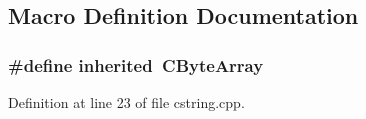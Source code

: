 \subsection{Macro Definition Documentation}
\subsubsection[{inherited}]{\setlength{\rightskip}{0pt plus 5cm}\#define inherited~C\-Byte\-Array}\label{cstring_8cpp_a3920e3b7cb0909b941b2409493acf8f1}


Definition at line 23 of file cstring.\-cpp.

